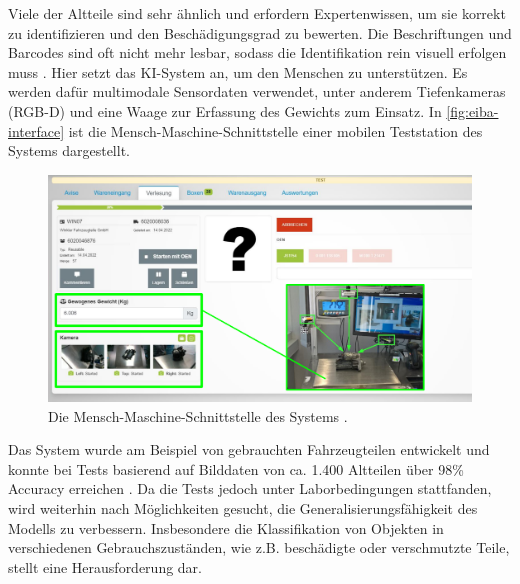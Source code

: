 
Viele der Altteile sind sehr ähnlich und erfordern Expertenwissen, um sie korrekt zu identifizieren und den Beschädigungsgrad zu bewerten. Die Beschriftungen und Barcodes sind oft nicht mehr lesbar, sodass die Identifikation rein visuell erfolgen muss \parencite{Wagner2022reziprok}. Hier setzt das KI-System an, um den Menschen zu unterstützen. Es werden dafür multimodale Sensordaten verwendet, unter anderem Tiefenkameras (RGB-D) und eine Waage zur Erfassung des Gewichts zum Einsatz. In \autoref{fig:eiba-interface} ist die Mensch-Maschine-Schnittstelle einer mobilen Teststation des Systems dargestellt.

\begin{figure}[t]
	\centering
	\includegraphics[width=\textwidth]{figure_eiba_interface.png}
	\caption[Die Mensch-Maschine-Schnittstelle des Systems.]{Die Mensch-Maschine-Schnittstelle des Systems \parencite{Wagner2022reziprok}.}
	\label{fig:eiba-interface}
\end{figure}

Das System wurde am Beispiel von gebrauchten Fahrzeugteilen entwickelt und konnte bei Tests basierend auf Bilddaten von ca. 1.400 Altteilen über 98\% Accuracy erreichen \parencite{ReziProK2019eiba}. Da die Tests jedoch unter Laborbedingungen stattfanden, wird weiterhin nach Möglichkeiten gesucht, die Generalisierungsfähigkeit des Modells zu verbessern. Insbesondere die Klassifikation von Objekten in verschiedenen Gebrauchszuständen, wie z.B. beschädigte oder verschmutzte Teile, stellt eine Herausforderung dar.


